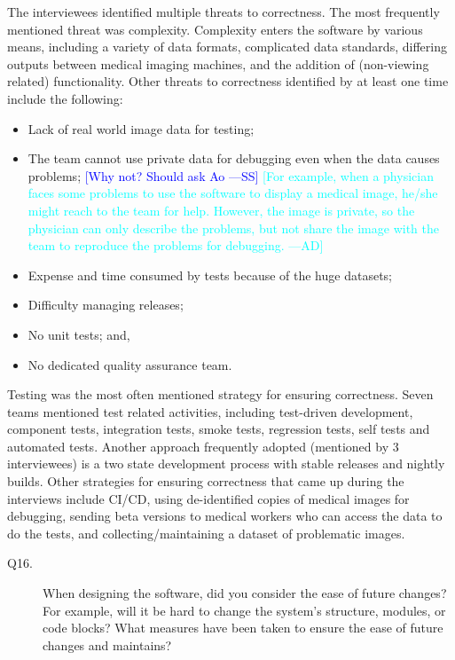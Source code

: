 \documentclass[final, 3p, times, authoryear]{elsarticle}
\newcommand{\authornote}[3]{\textcolor{#1}{[#3 ---#2]}}
\newcommand{\authornote}[3]{}
\newcommand{\wss}[1]{\authornote{blue}{SS}{#1}} %
\newcommand{\ad}[1]{\authornote{cyan}{AD}{#1}} %
\begin{document}
The interviewees identified multiple threats to correctness.  The most
frequently mentioned threat was complexity.  Complexity enters the software by
various means, including a variety of data formats, complicated data standards,
differing outputs between medical imaging machines, and the addition of
(non-viewing related) functionality.  Other threats to correctness identified by at least one time
include the following:
\begin{itemize}
\item Lack of real world image data for testing;
\item The team cannot use private data for debugging even when the data causes
problems; \wss{Why not?  Should ask Ao} \ad{For example, when a physician faces
some problems to use the software to display a medical image, he/she might reach
to the team for help. However, the image is private, so the physician can only
describe the problems, but not share the image with the team to reproduce the
problems for debugging.}
\item Expense and time consumed by tests because of the huge datasets;
\item Difficulty managing releases;
\item No unit tests; and,
\item No dedicated quality assurance team.
\end{itemize}

Testing was the most often mentioned strategy for ensuring correctness.  Seven
teams mentioned test related activities, including test-driven development,
component tests, integration tests, smoke tests, regression tests, self tests
and automated tests.  Another approach frequently adopted (mentioned by 3
interviewees) is a two state development process with stable releases and
nightly builds.  Other strategies for ensuring correctness that came up during
the interviews include CI/CD, using de-identified copies of medical images for
debugging, sending beta versions to medical workers who can access the data to
do the tests, and collecting/maintaining a dataset of problematic images.

\begin{description}
\item[Q16.] When designing the software, did you consider the ease of future
changes? For example, will it be hard to change the system’s structure, modules,
or code blocks? What measures have been taken to ensure the ease of future
changes and maintains?
\end{description}
\end{document}

